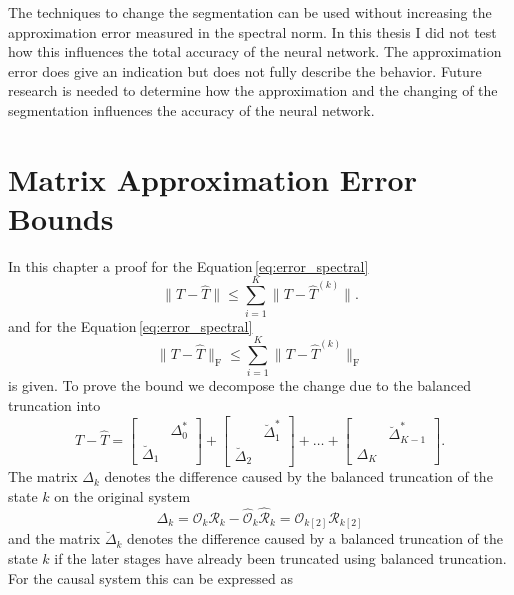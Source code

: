 \documentclass[numbers=noenddot,doctype=mastersthesis,BCOR=15mm,biblatex]{ldvbook}%
\newcommand{\R}{\mathcal{R}} %
\newcommand{\Ob}{\mathcal{O}} %
\begin{document}
The techniques to change the segmentation can be used without increasing the approximation error measured in the spectral norm.
In this thesis I did not test how this influences the total accuracy of the neural network. 
The approximation error does give an indication but does not fully describe the behavior.
Future research is needed to determine how the approximation and the changing of the segmentation influences the accuracy of the neural network.


\appendix
\chapter{Matrix Approximation Error Bounds}\label{A:Error Bounds}

In this chapter a proof for the Equation\,\ref{eq:error_spectral}
\begin{equation}
\|T-\hat{T}\| \leq \sum_{i=1}^K \|T-\hat{T}^{(k)}\| .
\end{equation}
and for the Equation\,\ref{eq:error_spectral}
\begin{equation}
\|T-\hat{T}\|_\text{F} \leq \sum_{i=1}^K \|T-\hat{T}^{(k)}\|_\text{F}
\end{equation}
is given.
To prove the bound we decompose the change due to the balanced truncation into
\begin{equation}\label{eq:decomposition_approx_sum}
	T-\hat{T} =
	\begin{bmatrix}
	&\Delta_0^*\\
	\breve{\Delta}_1
	\end{bmatrix}
	+
	\begin{bmatrix}
	&\breve{\Delta}_1^*\\
	\breve{\Delta}_2
	\end{bmatrix}
	+\dots+
	\begin{bmatrix}
	&\breve{\Delta}_{K-1}^*\\
	\Delta_K
	\end{bmatrix}
	.
\end{equation}
The matrix $\Delta_k$ denotes the difference caused by the balanced truncation of the state $k$ on the original system
\begin{equation}
	\Delta_k = \Ob_{k}\R_{k} - \hat{\Ob}_k\hat{\R}_k = \Ob_{k[2]}\R_{k[2]}
\end{equation}
and the matrix $\breve{\Delta}_k$ denotes the difference caused by a balanced truncation of the state $k$ if the later stages have already been truncated using balanced truncation. 
For the causal system this can be expressed as 
\end{document}
